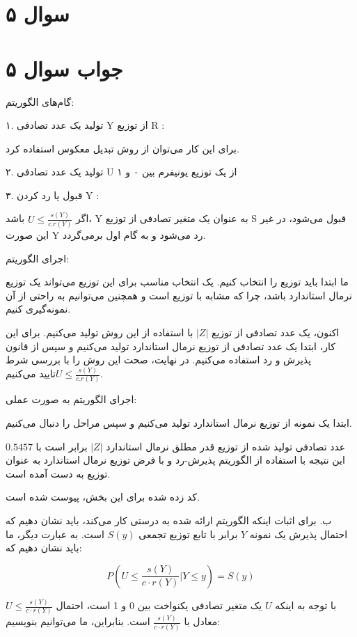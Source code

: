 \section*{سوال ۵}


\section*{جواب سوال ۵}

گام‌های الگوریتم:

۱. تولید یک عدد تصادفی Y از توزیع R :

برای این کار می‌توان از روش تبدیل معکوس استفاده کرد.

۲. تولید یک عدد تصادفی U از یک توزیع یونیفرم بین ۰ و ۱ 

۳. قبول یا رد کردن Y :

اگر
$U \leq \frac{s(Y)}{c.r(Y)}$
باشد، Y به عنوان یک متغیر تصادفی از توزیع S قبول می‌شود، در غیر این صورت Y رد می‌شود و به گام اول برمی‌گردد.

اجرای الگوریتم:


ما ابتدا باید توزیع 
را انتخاب کنیم. یک انتخاب مناسب برای این توزیع می‌تواند یک توزیع نرمال استاندارد باشد، چرا که مشابه با توزیع
است و همچنین می‌توانیم به راحتی از آن نمونه‌گیری کنیم.

اکنون، یک عدد تصادفی از توزیع
$|Z|$
با استفاده از این روش تولید می‌کنیم. برای این کار، ابتدا یک عدد تصادفی از توزیع نرمال استاندارد تولید می‌کنیم و سپس از قانون پذیرش و رد استفاده می‌کنیم. در نهایت، صحت این روش را با بررسی شرط 
$U \leq \frac{s(Y)}{c.r(Y)}$
​
تایید می‌کنیم.

اجرای الگوریتم به صورت عملی:

ابتدا یک نمونه از توزیع نرمال استاندارد تولید می‌کنیم و سپس مراحل را دنبال می‌کنیم.

عدد تصادفی تولید شده از توزیع قدر مطلق نرمال استاندارد 
$|Z|$
برابر است با 
$0.5457$
این نتیجه با استفاده از الگوریتم پذیرش-رد و با فرض توزیع نرمال استاندارد به عنوان توزیع 
به دست آمده است.

کد زده شده برای این بخش، پیوست شده است.

ب. برای اثبات اینکه الگوریتم ارائه شده به درستی کار می‌کند، باید نشان دهیم که احتمال پذیرش یک نمونه \( Y \) برابر با تابع توزیع تجمعی \( S(y) \) است. به عبارت دیگر، ما باید نشان دهیم که:

\[ P(U \leq \frac{s(Y)}{c \cdot r(Y)} | Y \leq y) = S(y) \]

با توجه به اینکه \( U \) یک متغیر تصادفی یکنواخت بین 0 و 1 است، احتمال \( U \leq \frac{s(Y)}{c \cdot r(Y)} \) معادل با \( \frac{s(Y)}{c \cdot r(Y)} \) است. بنابراین، ما می‌توانیم بنویسیم:

